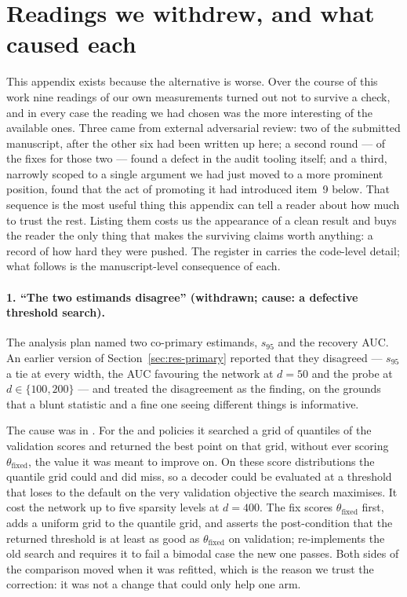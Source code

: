 \section{Readings we withdrew, and what caused each}
\label{app:withdrawn}

This appendix exists because the alternative is worse. Over the course of this work nine readings of
our own measurements turned out not to survive a check, and in every case the reading we had chosen
was the more interesting of the available ones. Three came from external adversarial review: two of
the submitted manuscript, after the other six had been written up here; a second round --- of the
fixes for those two --- found a defect in the audit tooling itself; and a third, narrowly scoped to a
single argument we had just moved to a more prominent position, found that the act of promoting it
had introduced item~9 below. That sequence is the most useful thing this appendix can tell a reader
about how much to trust the rest. Listing them costs us the appearance of a clean
result and buys the reader the only thing that makes the surviving claims worth anything: a record
of how hard they were pushed. The register in  carries the code-level
detail; what follows is the manuscript-level consequence of each.

\paragraph{1. ``The two estimands disagree'' (withdrawn; cause: a defective threshold search).} The
analysis plan named two co-primary estimands, $s_{95}$ and the recovery AUC. An earlier version of
Section~\ref{sec:res-primary} reported that they disagreed --- $s_{95}$ a tie at every width, the
AUC favouring the network at $d=50$ and the probe at $d\in\{100,200\}$ --- and treated the
disagreement as the finding, on the grounds that a blunt statistic and a fine one seeing different
things is informative.

The cause was in . For the  and  policies it
searched a grid of quantiles of the validation scores and returned the best point on that grid,
without ever scoring $\theta_{\mathrm{fixed}}$, the value it was meant to improve on. On these score
distributions the quantile grid could and did miss, so a decoder could be evaluated at a threshold
that loses to the default on the very validation objective the search maximises. It cost the network
up to five sparsity levels at $d=400$. The fix scores $\theta_{\mathrm{fixed}}$ first, adds a uniform
grid to the quantile grid, and asserts the post-condition that the returned threshold is at least as
good as $\theta_{\mathrm{fixed}}$ on validation; 
re-implements the old search and requires it to fail a bimodal case the new one passes. Both sides of
the comparison moved when it was refitted, which is the reason we trust the correction: it was not a
change that could only help one arm.

